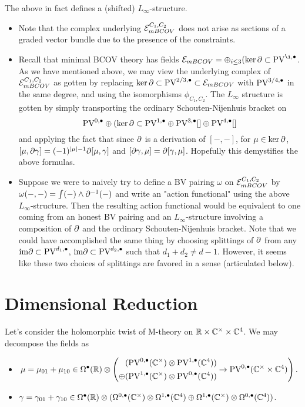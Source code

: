 \documentclass[11pt]{article}
\begin{document}
\begin{prop}
The above in fact defines a (shifted) $L_\infty$-structure.
\end{prop}

\begin{rmk}
\begin{itemize}
\item Note that the complex underlying $\mathcal{E}_{mBCOV}^{C_1,C_2}$ does not arise as sections of a graded vector bundle due to the presence of the constraints.
\item Recall that minimal BCOV theory has fields $\mc E_{mBCOV}=\oplus_{i\leq 3} (\ker\del\subset\PV^{\i,\bullet}$. As we have mentioned above, we may view the underlying complex of $\mathcal{E}_{mBCOV}^{C_1,C_2}$ as gotten by replacing $\ker\partial\subset\text{PV}^{2/3,\bullet}\subset\mathcal{E}_{mBCOV}$ with $\text{PV}^{3/4,\bullet}$ in the same degree, and using the isomorphisms $\phi_{C_1,C_2}$. The $L_\infty$ structure is gotten by simply transporting the ordinary Schouten-Nijenhuis bracket on \[\text{PV}^{0,\bullet}\oplus(\ker\partial\subset\text{PV}^{1,\bullet}\oplus\text{PV}^{3,\bullet}[]\oplus\text{PV}^{4,\bullet}[]\] and applying the fact that since $\partial$ is a derivation of $[-,-]$, for $\mu\in\ker\partial$, $[\mu,\partial\gamma]=(-1)^{|\mu|-1}\partial[\mu,\gamma]$ and $[\partial\gamma,\mu]=\partial[\gamma,\mu]$. Hopefully this demystifies the above formulas.
\item Suppose we were to naively try to define a BV pairing $\omega$ on $\mathcal{E}_{mBCOV}^{C_1,C_2}$ by $\omega(-,-)=\int (-)\wedge\partial^{-1}(-)$ and write an "action functional" using the above $L_\infty$-structure. Then the resulting action functional would be equivalent to one coming from an honest BV pairing and an $L_\infty$-structure involving a composition of $\partial$ and the ordinary Schouten-Nijenhuis bracket. Note that we could have accomplished the same thing by choosing splittings of $\partial$ from any $\text{im}\partial\subset \text{PV}^{d_1,\bullet}$, $\text{im}\partial\subset\text{PV}^{d_2,\bullet}$ such that $d_1+d_2\neq d-1$. However, it seems like these two choices of splittings are favored in a sense (articulated below). 
\end{itemize}
\end{rmk}
\fi

\section{Dimensional Reduction}
Let's consider the holomorphic twist of M-theory on $\mathbb{R}\times\mathbb{C}^\times\times\mathbb{C}^4$. We may decompose the fields as
\begin{itemize}
\item \[\mu=\mu_{01}+\mu_{10}\in\Omega^\bullet(\mathbb{R})\otimes\left (\begin{aligned} &( \text{PV}^{0,\bullet}(\mathbb{C}^\times)\otimes\text{PV}^{1,\bullet}(\mathbb{C}^4)) \\ \oplus & (\text{PV}^{1,\bullet}(\mathbb{C}^\times)\otimes\text{PV}^{0,\bullet}(\mathbb{C}^4))\end{aligned} \to\text{PV}^{0,\bullet}(\mathbb{C}^\times\times\mathbb{C}^4)\right ).\]
\item $\gamma=\gamma_{01}+\gamma_{10}\in \Omega^\bullet(\mathbb{R})\otimes(\Omega^{0,\bullet}(\mathbb{C}^\times)\otimes\Omega^{1,\bullet}(\mathbb{C}^4)\oplus\Omega^{1,\bullet}(\mathbb{C}^\times)\otimes\Omega^{0,\bullet}(\mathbb{C}^4))$.
\end{itemize}
\end{document}
